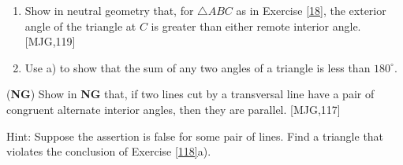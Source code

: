 \begin{exercise}
\label{118} 
\begin{enumerate}
\item Show in neutral geometry that, for $\triangle ABC$ as in
Exercise \ref{18}, the exterior angle of the triangle at $C$ is
greater than either remote interior angle. [MJG,119]
\item Use a) to show that the sum of any two angles of a triangle is less than $180^{\circ}$.
\end{enumerate}
\end{exercise}

\begin{exercise}
(\textbf{NG}) Show in \textbf{NG} that, if two lines cut by a
transversal line have a pair of congruent alternate interior angles,
then they are parallel. [MJG,117]

Hint: Suppose the assertion is false for some pair of lines. Find a
triangle that violates the conclusion of Exercise \ref{118}a).
\end{exercise}
